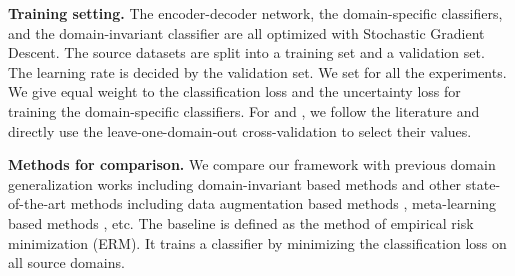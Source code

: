 \documentclass{article}
\begin{document}
\textbf{Training setting.}
The encoder-decoder network, the domain-specific classifiers, and the domain-invariant classifier are all optimized with Stochastic Gradient Descent. The source datasets are split into a training set and a validation set. The learning rate is decided by the validation set. We set  for all the experiments. We give equal weight to the classification loss and the uncertainty loss for training the domain-specific classifiers. For  and , we follow the literature \cite{dou2019domain,balaji2018metareg} and directly use the leave-one-domain-out cross-validation to select their values.

\textbf{Methods for comparison.}
We compare our framework with previous domain generalization works  including domain-invariant based methods \cite{li2018deep,wang2019learning,chattopadhyay2020learning,zhao2020domain,du2020learning,mahajan2021domain,rame2022fishr,bui2021exploiting} and other state-of-the-art methods \cite{d2018domain,balaji2018metareg,carlucci2019domain,li2019episodic,dou2019domain,zhou2020domain,nam2021reducing,huangRSC2020,borlino2021rethinking,zhang2021deep,cha2021swad} including data augmentation based methods \cite{nam2021reducing,zhou2020domain,borlino2021rethinking}, meta-learning based methods \cite{balaji2018metareg,li2019episodic,dou2019domain}, etc. 
The baseline is defined as the method of empirical risk minimization (ERM). It trains a classifier by minimizing the classification loss on all source domains.
\end{document}
